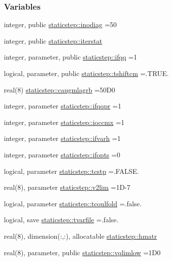 \subsubsection*{Variables}
\begin{DoxyCompactItemize}
\item 
integer, public \hyperlink{namespacestaticstep_a7c45df3e5b6980084116405e280a9f1e}{staticstep\+::inodiag} =50
\item 
integer, public \hyperlink{namespacestaticstep_a86d905176be26dd2e3298e4a93df1195}{staticstep\+::iterstat}
\item 
integer, parameter, public \hyperlink{namespacestaticstep_a5b2a4a8f2936782b9d82c2ef307483a9}{staticstep\+::ifqq} =1
\item 
logical, parameter, public \hyperlink{namespacestaticstep_adc9c0c23d06e25e92e85a216712c6154}{staticstep\+::tshiftcm} =.T\+R\+U\+E.
\item 
real(8) \hyperlink{namespacestaticstep_af67d6280afe5bb85094f540b7745b3ff}{staticstep\+::caugmlagrb} =50\+D0
\item 
integer, parameter \hyperlink{namespacestaticstep_a47f36e15f8422ee671acd2861b0aefb3}{staticstep\+::ifqqpr} =1
\item 
integer, parameter \hyperlink{namespacestaticstep_a397d9c54d15061e7cfec64610233bdac}{staticstep\+::ioccmx} =1
\item 
integer, parameter \hyperlink{namespacestaticstep_afb495985f10f48f0820ffc0a35884c29}{staticstep\+::ifvarh} =1
\item 
integer, parameter \hyperlink{namespacestaticstep_a6234332d57c0353da44fba6dd923ebf2}{staticstep\+::ifopts} =0
\item 
logical, parameter \hyperlink{namespacestaticstep_a7fb35294b1ede0791d641687cc28fda6}{staticstep\+::tcstp} =.F\+A\+L\+S\+E.
\item 
real(8), parameter \hyperlink{namespacestaticstep_a1b09ef2334c64437644701c17a440ca5}{staticstep\+::v2lim} =1\+D-\/7
\item 
logical, parameter \hyperlink{namespacestaticstep_adffa15eea060b1ffa80c6aaf1aac37ee}{staticstep\+::tcoulfold} =.false.
\item 
logical, save \hyperlink{namespacestaticstep_ac12060bc672bbf63f1d4c9aaee259595}{staticstep\+::tvarfile} =.false.
\item 
real(8), dimension(\+:,\+:), allocatable \hyperlink{namespacestaticstep_a929a7dc3c5e6260892e06030be3db7af}{staticstep\+::hmatr}
\item 
real(8), parameter, public \hyperlink{namespacestaticstep_ae5b772f9920183fe3d5d039a8d9d8572}{staticstep\+::vqlimlow} =1\+D0

\end{DoxyCompactItemize}
